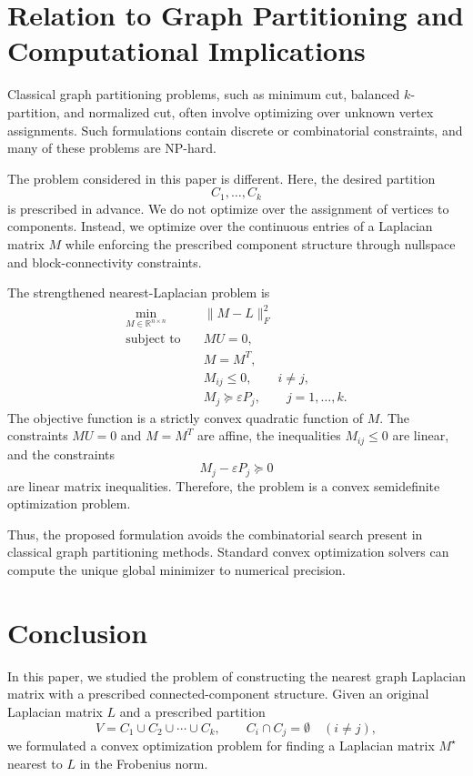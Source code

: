 \documentclass[11pt]{article}
\begin{document}
\section{Relation to Graph Partitioning and Computational Implications}

Classical graph partitioning problems, such as minimum cut, balanced
$k$-partition, and normalized cut, often involve optimizing over unknown
vertex assignments. Such formulations contain discrete or combinatorial
constraints, and many of these problems are NP-hard.

The problem considered in this paper is different. Here, the desired partition
\[
C_1,\ldots,C_k
\]
is prescribed in advance. We do not optimize over the assignment of vertices to
components. Instead, we optimize over the continuous entries of a Laplacian
matrix $M$ while enforcing the prescribed component structure through
nullspace and block-connectivity constraints.

The strengthened nearest-Laplacian problem is
\[
\begin{aligned}
	\min_{M\in\mathbb R^{n\times n}}\quad
	&\|M-L\|_F^2\\
	\text{subject to}\quad
	&MU=0,\\
	&M=M^T,\\
	&M_{ij}\le0,\qquad i\ne j,\\
	&M_j\succeq\varepsilon P_j,\qquad j=1,\ldots,k.
\end{aligned}
\]
The objective function is a strictly convex quadratic function of $M$. The
constraints $MU=0$ and $M=M^T$ are affine, the inequalities $M_{ij}\le0$ are
linear, and the constraints
\[
M_j-\varepsilon P_j\succeq0
\]
are linear matrix inequalities. Therefore, the problem is a convex
semidefinite optimization problem.

Thus, the proposed formulation avoids the combinatorial search present in
classical graph partitioning methods. Standard convex optimization solvers can
compute the unique global minimizer to numerical precision.
	
	\section{Conclusion}
	
	In this paper, we studied the problem of constructing the nearest graph
	Laplacian matrix with a prescribed connected-component structure. Given an
	original Laplacian matrix $L$ and a prescribed partition
	\[
	V=C_1\cup C_2\cup\cdots\cup C_k,
	\qquad
	C_i\cap C_j=\emptyset\quad (i\ne j),
	\]
	we formulated a convex optimization problem for finding a Laplacian matrix
	$M^\star$ nearest to $L$ in the Frobenius norm.
	
\end{document}
